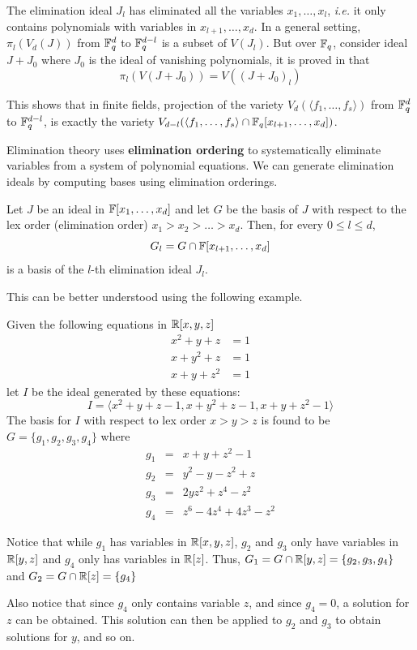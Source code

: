 The elimination ideal $J_l$ has eliminated all the variables 
$x_1,\dots,x_l$, {\it i.e.} it only contains polynomials with variables in
$x_{l+1},\dots,x_d$. 
In a general setting,
$\pi_l(V_d(J))$ from ${\mathbb{F}}_{q}^d$ to ${\mathbb{F}}_{q}^{d-l}$ is a subset of $V(J_l)$. But over ${\mathbb{F}}_{q}$, 
consider ideal $J+J_0$ where $J_0$ is the ideal of vanishing polynomials, it is proved in \cite{gao:qe-gf-gb}
that 
$$\pi_l(V(J+J_0)) = V((J+J_0)_l)$$


This shows that in finite fields, projection of the variety $V_{d}(\langle f_1,\dots,f_s\rangle)$
from ${\mathbb{F}}_{q}^d$ to ${\mathbb{F}}_{q}^{d-l}$, is exactly the variety $V_{d-l}(\langle f_1,\dots,f_s\rangle\cap {\mathbb{F}}_{q}[x_{l+1},\dots,x_d])$.

Elimination theory uses {\bf elimination ordering} 
to systematically eliminate variables from a system of polynomial
equations.
We can generate elimination ideals by computing
\Grobner bases using elimination orderings. 

\begin{Theorem}
Let $J$ be an ideal in ${\mathbb{F}}[x_1,\dots,x_d]$ and let $G$ be the \Grobner 
basis of $J$ with respect to the lex order (elimination order) 
$x_1>x_2>\dots>x_d$. Then, for every $0\leq l\leq d$,
\begin{equation}
G_l=G\cap {\mathbb{F}}[x_{l+1},\dots,x_d]
\end{equation}
is a \Grobner basis of the $l$-th elimination ideal $J_l$.
\label{thm:elimth}
\end{Theorem}

This can be better understood using the following example.

\begin{Example}
Given the following equations in ${\mathbb{R}}[x,y,z]$
\begin{eqnarray}
x^2+y+z&=1 \nonumber \\
x+y^2+z&=1 \nonumber \\
x+y+z^2&=1 \nonumber
\end{eqnarray}
let $I$ be the ideal generated by these equations:
\begin{equation}
I=\langle x^2+y+z-1, x+y^2+z-1, x+y+z^2-1\rangle \nonumber
\end{equation}
The \Grobner basis for $I$ with respect to lex order $x>y>z$ is 
found to be $G=\{g_1,g_2,g_3,g_4\}$ where
\begin{eqnarray}
g_1&=&x+y+z^2-1 \nonumber \\
g_2&=&y^2-y-z^2+z \nonumber \\
g_3&=&2yz^2+z^4-z^2 \nonumber \\
g_4&=&z^6-4z^4+4z^3-z^2 \nonumber
\end{eqnarray}

Notice that while $g_1$ has variables in ${\mathbb{R}}[x,y,z]$, $g_2$ and $g_3$ only 
have variables in ${\mathbb{R}}[y,z]$ and $g_4$ only has variables in ${\mathbb{R}}[z]$. Thus, 
$G_1=G\cap {\mathbb{R}}[y,z]=\{g_2,g_3,g_4\}$ and $G_2=G\cap {\mathbb{R}}[z]=\{g_4\}$

Also notice that since $g_4$ only contains variable $z$, and since $g_4=0$, 
a solution for $z$ can be obtained. This solution can then be applied to 
$g_2$ and $g_3$ to obtain solutions for $y$, and so on.
\end{Example}

